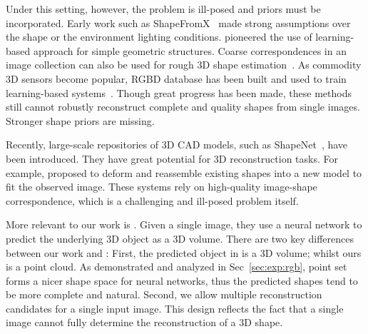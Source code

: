 Under this setting, however, the problem is ill-posed and priors must be incorporated. Early work such as ShapeFromX~\cite{horn1989obtaining,aloimonos1988shape} made strong assumptions over the shape or the environment lighting conditions. \cite{hoiem2005automatic,saxena2009make3d} pioneered the use of learning-based approach for simple geometric structures. Coarse correspondences in an image collection can also be used for rough 3D shape estimation~\cite{shapesKarTCM15,carreira2016lifting}. As commodity 3D sensors become popular, RGBD database has been built and used to train learning-based systems~\cite{eigen2014depth,Fouhey13}. Though great progress has been made, these methods still cannot robustly reconstruct complete and quality shapes from single images. Stronger shape priors are missing.

Recently, large-scale repositories of 3D CAD models, such as ShapeNet~\cite{shapenet2015}, have been introduced. They have great potential for 3D reconstruction tasks. For example, \cite{su2014estimating,huang2015single} proposed to deform and reassemble existing shapes into a new model to fit the observed image. These systems rely on high-quality image-shape correspondence, which is a challenging and ill-posed problem itself.

More relevant to our work is \cite{choy20163d}. 
Given a single image, they use a neural network to predict the underlying 3D object as a 3D volume. There are two key differences between our work and \cite{choy20163d}: First, the predicted object in \cite{choy20163d} is a 3D volume; whilst ours is a point cloud. As demonstrated and analyzed in Sec~\ref{sec:exp:rgb}, point set forms a nicer shape space for neural networks, thus the predicted shapes tend to be more complete and natural. Second, we allow multiple reconstruction candidates for a single input image. This design reflects the fact that a single image cannot fully determine the reconstruction of a 3D shape. %

